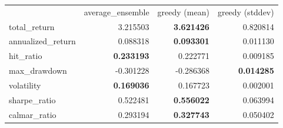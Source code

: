 \begin{tabular}{lrrr}
 & average_ensemble & greedy (mean) & greedy (stddev) \\
total_return & 3.215503 & \bfseries 3.621426 & 0.820814 \\
annualized_return & 0.088318 & \bfseries 0.093301 & 0.011130 \\
hit_ratio & \bfseries 0.233193 & 0.222771 & 0.009185 \\
max_drawdown & -0.301228 & -0.286368 & \bfseries 0.014285 \\
volatility & \bfseries 0.169036 & 0.167723 & 0.002001 \\
sharpe_ratio & 0.522481 & \bfseries 0.556022 & 0.063994 \\
calmar_ratio & 0.293194 & \bfseries 0.327743 & 0.050402 \\
\end{tabular}
